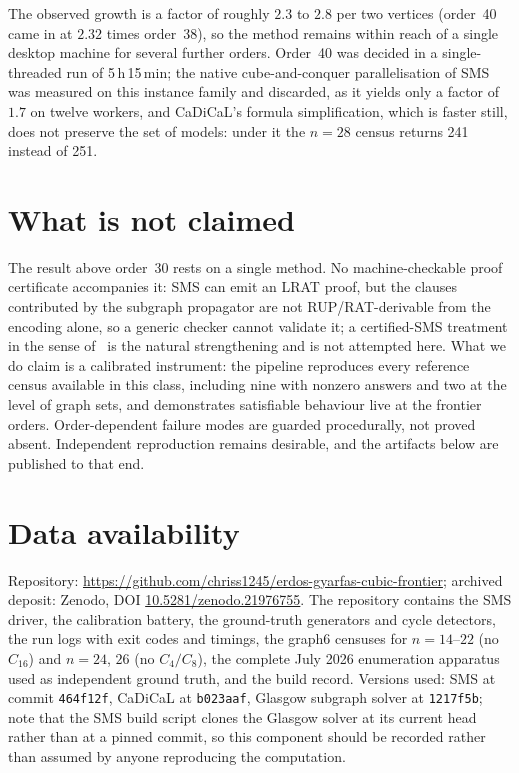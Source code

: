 \documentclass[11pt]{article}
\begin{document}
The observed growth is a factor of roughly $2.3$ to $2.8$ per two vertices
(order~40 came in at $2.32$ times order~38), so the method remains within reach
of a single desktop machine for several further orders. Order~40 was decided in
a single-threaded run of 5\,h\,15\,min; the native cube-and-conquer
parallelisation of SMS was measured on this instance family and discarded, as
it yields only a factor of~$1.7$ on twelve workers, and CaDiCaL's formula
simplification, which is faster still, does not preserve the set of models:
under it the $n=28$ census returns 241 instead of 251.

\section{What is not claimed}

The result above order~30 rests on a single method. No machine-checkable proof
certificate accompanies it: SMS can emit an LRAT proof, but the clauses
contributed by the subgraph propagator are not RUP/RAT-derivable from the
encoding alone, so a generic checker cannot validate it; a certified-SMS
treatment in the sense of~\cite{sms} is the natural strengthening and is not
attempted here. What we do claim is a calibrated instrument: the pipeline
reproduces every reference census available in this class, including nine with
nonzero answers and two at the level of graph sets, and demonstrates
satisfiable behaviour live at the frontier orders. Order-dependent failure
modes are guarded procedurally, not proved absent. Independent reproduction
remains desirable, and the artifacts below are published to that end.

\section{Data availability}

Repository:
\url{https://github.com/chriss1245/erdos-gyarfas-cubic-frontier};
archived deposit: Zenodo, DOI
\href{https://doi.org/10.5281/zenodo.21976755}{10.5281/zenodo.21976755}.
The repository contains the
SMS driver, the calibration battery, the ground-truth generators and cycle
detectors, the run logs with exit codes and timings, the graph6 censuses for
$n=14$--$22$ (no $C_{16}$) and $n=24$, $26$ (no $C_4/C_8$), the complete
July 2026 enumeration apparatus used as independent ground truth, and the build
record. Versions used: SMS at commit \texttt{464f12f}, CaDiCaL at
\texttt{b023aaf}, Glasgow subgraph solver at \texttt{1217f5b}; note that the
SMS build script clones the Glasgow solver at its current head rather than at
a pinned commit, so this component should be recorded rather than assumed by
anyone reproducing the computation.
\end{document}
